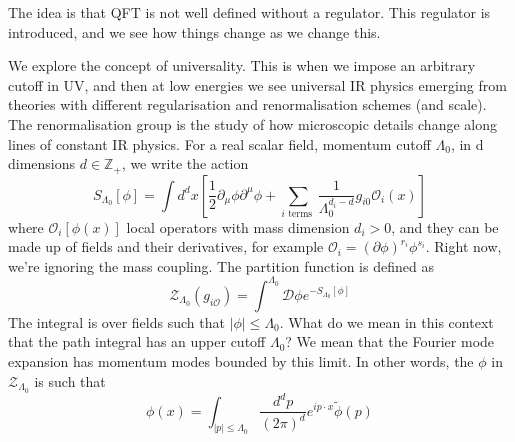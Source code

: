 \documentclass[11pt, oneside]{article}   	%
\theoremstyle{slanted}
\begin{document}
The idea is that QFT is not well defined 
without a regulator. This regulator is introduced, 
and we see how things change as we change this. 

We explore the concept of universality. 
This is when we impose an arbitrary cutoff in UV, 
and then at low energies we see universal IR physics 
emerging from 
theories with different regularisation and 
renormalisation schemes (and scale). 
The renormalisation group is the 
study of how microscopic details 
change along lines of constant IR physics. 
For a real scalar field, momentum cutoff 
$ \Lambda _ 0 $, in d dimensions $ d \in \mathbb{ Z }_ +  $, 
we write the action 
\[
S _{ \Lambda_ 0 } \left[  \phi  \right]   = \int d ^ d x 
\left[  \frac{1}{2 } \partial  _ \mu \phi \partial  ^ \mu \phi 
+ \sum _{ i \text{ terms } } \frac{1}{\Lambda _ 0 ^{ 
d _ i - d } } g _{ i 0  }  \mathcal{ O } _ i \left( x \right) \right] 
\] where $ \mathcal{ O } _ i \left[  \phi \left( x  \right)   \right]   $
local operators with mass dimension $ d _ i > 0 $, 
and they can be made up of fields and their derivatives, 
for example $ \mathcal{ O }_ i  = \left( \partial  
\phi \right)  ^{ r _ i } \phi ^{ s _ i  }  $. 
Right 
now, we're ignoring the mass coupling. 
The partition function is 
defined as 
\[
\mathcal{ Z } _{ \Lambda _ 0 } \left( g _{ i \mathcal{ O }}  \right)  
 = \int ^{ \Lambda _ 0  } \mathcal{ D } \phi e ^{  - S _{ \Lambda _ 0 } \left[  \phi  \right]  }
\] The integral is over fields 
such that $ | \phi | \leq \Lambda _ 0 $. 
What do we mean in this context that 
the path integral has an upper cutoff $ \Lambda _ 0 $? 
We mean that the Fourier mode expansion has 
momentum modes bounded by this limit. 
In other words, the $ \phi $ in $ \mathcal{ Z } _{ \Lambda _ 0 } $ 
is such that 
\[
 \phi ( x) = \int _{ | p | \leq \Lambda _ 0 } \frac{d ^ d p }{ \left( 2 \pi  \right)  
 ^{ d }  } e ^{ i p \cdot  x } \tilde{ \phi  } \left( p  \right)  
\]
\end{document}
